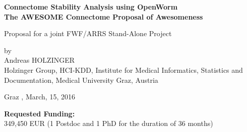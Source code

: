 \documentclass[a4paper,11pt]{article}
\begin{document}
\begin{titlepage}
\begin{center}
\bfseries\Large
Connectome Stability Analysis using OpenWorm\\
The AWESOME Connectome Proposal of Awesomeness
\\[0,6cm]
\normalfont\normalsize

Proposal for a joint FWF/ARRS Stand-Alone Project 

by\\
Andreas HOLZINGER\\

Holzinger Group, HCI-KDD, Institute for Medical Informatics, Statistics and Documentation,
Medical University Graz, Austria
\\[0,4cm]
\vspace{0.7\baselineskip}
\begin{figure}[ht]
  \centering
\end{figure}
%
Graz , March, 15, 2016 
%
\end{center}
\vspace{0.5\baselineskip}
\end{titlepage}
%
%
{\bf Requested Funding:}\\ 349,450 EUR (1 Postdoc and 1 PhD for the duration of 36 months) 
\end{document}
